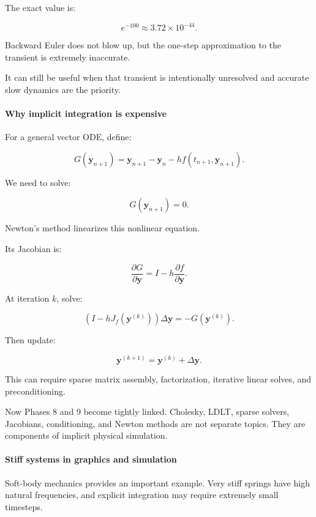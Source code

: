 The exact value is:

\[
e^{-100}\approx3.72\times10^{-44}.
\]

Backward Euler does not blow up, but the one-step approximation to the transient is extremely inaccurate.

It can still be useful when that transient is intentionally unresolved and accurate slow dynamics are the priority.

\paragraph{Why implicit integration is expensive}\label{02-foundations-ii-ch025-why-implicit-integration-is-expensive}

For a general vector ODE, define:

\[
G(\mathbf y_{n+1}) = \mathbf y_{n+1}-\mathbf y_n -hf(t_{n+1},\mathbf y_{n+1}).
\]

We need to solve:

\[
G(\mathbf y_{n+1})=0.
\]

Newton's method linearizes this nonlinear equation.

Its Jacobian is:

\[
\frac{\partial G}{\partial\mathbf y} = I-h\frac{\partial f}{\partial\mathbf y}.
\]

At iteration \(k\), solve:

\[
\boxed{ \left(I-hJ_f(\mathbf y^{(k)})\right)\Delta\mathbf y = -G(\mathbf y^{(k)}) }.
\]

Then update:

\[
\mathbf y^{(k+1)}=\mathbf y^{(k)}+\Delta\mathbf y.
\]

This can require sparse matrix assembly, factorization, iterative linear solves, and preconditioning.

Now Phases 8 and 9 become tightly linked. Cholesky, LDLT, sparse solvers, Jacobians, conditioning, and Newton methods are not separate topics. They are components of implicit physical simulation.

\paragraph{Stiff systems in graphics and simulation}\label{02-foundations-ii-ch025-stiff-systems-in-graphics-and-simulation}

Soft-body mechanics provides an important example. Very stiff springs have high natural frequencies, and explicit integration may require extremely small timesteps.


